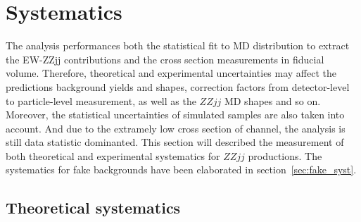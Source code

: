 \section{Systematics}
\label{sec:systematics}

The analysis performances both the statistical fit to MD distribution to extract the EW-ZZjj contributions
and the cross section measurements in fiducial volume.
Therefore, theoretical and experimental uncertainties may affect the predictions background yields and shapes, 
correction factors from detector-level to particle-level measurement, as well as the $ZZjj$ MD shapes and so on.
Moreover, the statistical uncertainties of simulated samples are also taken into account.
And due to the extramely low cross section of \llll channel, the analysis is still data statistic dominanted.
This section will described the measurement of both theoretical and experimental systematics for $ZZjj$ productions.
The systematics for fake backgrounds have been elaborated in section~\ref{sec:fake_syst}.

\subsection{Theoretical systematics}

